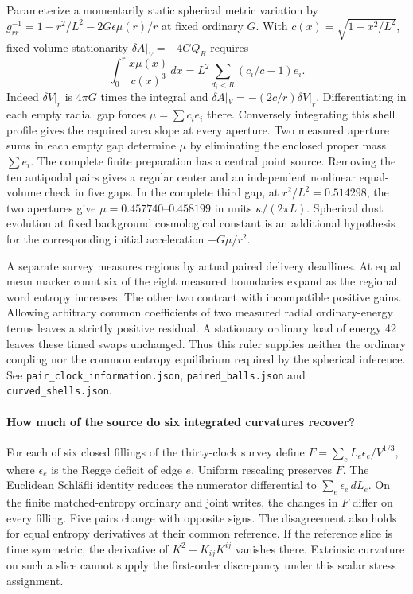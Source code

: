\documentclass[11pt]{article}
\begin{document}
Parameterize a momentarily static spherical metric variation by
$g_{rr}^{-1}=1-r^2/L^2-2G\epsilon\mu(r)/r$ at fixed ordinary $G$. With
$c(x)=\sqrt{1-x^2/L^2}$, fixed-volume stationarity
$\delta A|_V=-4GQ_R$ requires
\[
 \int_0^r \frac{x\mu(x)}{c(x)^3}\,dx
 = L^2\sum_{d_i<R}(c_i/c-1)e_i .
\]
Indeed $\delta V|_r$ is $4\pi G$ times the integral and
$\delta A|_V=-(2c/r)\delta V|_r$. Differentiating in each empty radial
gap forces $\mu=\sum c_i e_i$ there. Conversely integrating this shell
profile gives the required area slope at every aperture. Two measured
aperture sums in each empty gap determine $\mu$ by eliminating the
enclosed proper mass $\sum e_i$. The complete finite preparation has a
central point source. Removing the ten antipodal pairs gives a regular
center and an independent nonlinear equal-volume check in five gaps.
In the complete third gap, at $r^2/L^2=0.514298$, the two apertures give
$\mu=0.457740$--$0.458199$ in units $\kappa/(2\pi L)$. Spherical dust
evolution at fixed background cosmological constant is an additional
hypothesis for the corresponding initial acceleration $-G\mu/r^2$.

A separate survey measures regions by actual paired delivery deadlines.
At equal mean marker count six of the eight measured boundaries expand
as the regional word entropy increases. The other two contract with
incompatible positive gains. Allowing arbitrary common coefficients of
two measured radial ordinary-energy terms leaves a strictly
positive residual. A stationary ordinary load of energy 42 leaves these
timed swaps unchanged. Thus this ruler supplies neither the ordinary
coupling nor the common entropy equilibrium required by the spherical
inference. See \texttt{pair\_clock\_information.json},
\texttt{paired\_balls.json} and \texttt{curved\_shells.json}.

\paragraph{How much of the source do six integrated curvatures recover?}
For each of six closed fillings of the thirty-clock survey define
\(F=\sum_e L_e\epsilon_e/V^{1/3}\), where \(\epsilon_e\) is the
Regge deficit of edge \(e\). Uniform rescaling preserves \(F\).
The Euclidean Schl\"afli identity reduces the numerator differential
to \(\sum_e\epsilon_e\,dL_e\). On the finite matched-entropy
ordinary and joint writes, the changes in \(F\) differ on every
filling. Five pairs change with opposite signs. The disagreement
also holds for equal entropy derivatives at their common reference.
If the reference slice is time symmetric, the derivative of
\(K^2-K_{ij}K^{ij}\) vanishes there. Extrinsic curvature on such a
slice cannot supply the first-order discrepancy under this scalar
stress assignment.
\end{document}
